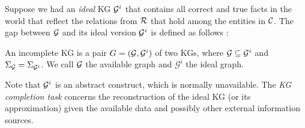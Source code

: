 

Suppose we had an \emph{ideal} KG $\mathcal{G}^i$ that contains all correct and true facts in the world that reflect the relations from $\mathcal{R}$ that hold among the entities in $\mathcal{C}$. The gap between $\mathcal{G}$ and its ideal version $\mathcal{G}^i$ is defined as follows \cite{rdfcomp}: 

\begin{definition} An incomplete KG is a pair
    $G = (\mathcal{G}, \mathcal{G}^i)$ of two KGs, where $\mathcal{G}\subseteq \mathcal{G}^i$ and
    $\Sigma_{\mathcal{G}}=\Sigma_{\mathcal{G}^i}$. We call $\mathcal{G}$ the available
    graph and $\mathcal{G}^i$ the ideal graph.  \end{definition}
    
Note that $\mathcal{G}^i$ is an abstract construct, which is normally unavailable. The \emph{KG completion task} concerns the reconstruction of the ideal KG (or its approximation) given the available data and possibly other external information sources.


